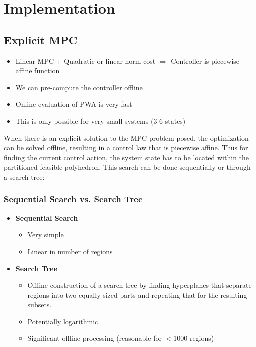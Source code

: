 \documentclass[8pt,a4paper]{scrartcl}
\begin{document}
\begin{multicols*}{3}
\begin{multicols*}{4}
{\begin{itemize}
\end{itemize}
}%

\section{Implementation}

\subsection{Explicit MPC}

\begin{itemize}

\item Linear MPC + Quadratic or linear-norm cost $\Rightarrow$ Controller is piecewise affine function
\item We can pre-compute the controller offline
\item Online evaluation of PWA is very fast
\item This is only possible for very small systems (3-6 states)
\end{itemize}

When there is an explicit solution to the MPC problem posed, the optimization can be solved offline, resulting in a control law that is piecewise affine. Thus for finding the current control action, the system state has to be located within the partitioned feasible polyhedron.  This search can be done sequentially or through a search tree:

\subsubsection{Sequential Search vs. Search Tree}

\begin{itemize}

\item \textbf{Sequential Search}
\begin{itemize}
\item Very simple
\item Linear in number of regions
\end{itemize}
\item \textbf{Search Tree}
\begin{itemize}
\item Offline construction of a search tree by finding hyperplanes that separate regions into two equally sized parts and repeating that for the resulting subsets.
\item Potentially logarithmic
\item Significant offline processing (reasonable for $<1000$ regions)
\end{itemize}
\end{itemize}


\end{multicols*}
\end{multicols*}
\end{document}
